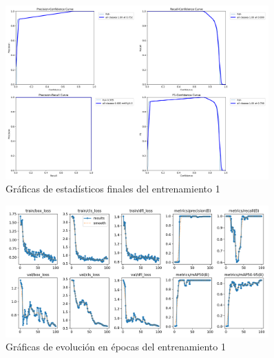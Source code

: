 \begin{itemize}
    \begin{figure}[H]
        \centering
        \includegraphics[width=0.9\textwidth]{images/13/b/1/PR.png}
        \caption{Gráficas de estadísticos finales del entrenamiento 1}
        \label{fig:Estadisticos1}
    \end{figure}
    \begin{figure}[H]
        \centering
        \includegraphics[width=0.9\textwidth]{images/13/b/1/results.png}
        \caption{Gráficas de evolución en épocas del entrenamiento 1}
        \label{fig:Resultados1}
    \end{figure}
\end{itemize}
